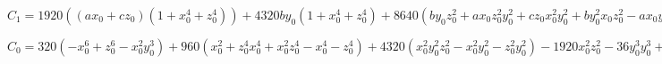 $C_1  = 1920((ax_0 + cz_0)(1 + x_0^4 + z_0^4)) + 4320by_0(1 + x_0^4 + z_0^4) + 8640(­by_0z_0^2 + 
ax_0z_0^2y_0^2 + cz_0x_0^2y_0^2 + by_0^2x_0z_0^2 -­ ax_0y_0^2 + ay_0^2 + ax_0^3y_0^2 -­ cz_0y_0^2 + cz_0^3y_0^2 - by_0x_0^2) -­ 
3840(cz_0^3 + ax_0^3 + ax_0z_0^2 - ­ax_0^2z_0^2 + cz_0x_0^2 -­ cz_0^3x_0^2) -­ 19440(by_0^3(1 -­ x_0^2 -­ z_0^2)) + 
9720.0(y_0^4(ax_0 + cz_0)) + 21870(by_0^4)­ - 640(ax_0y_0^3 - by_0^2x_0^2) -­ 108(cz_0^2y_0^2 + by_0^2y_0^3)$
 
$C_0 = 320(-­x_0^6 + z_0^6 - x_0^2y_0^3) + 960(x_0^2 + z_0^4x_0^4 + x_0^2z_0^4 -­ x_0^4 -­ z_0^4) + 4320(x_0^2y_0^2z_0^2 -­ 
x_0^2y_0^2 -­ z_0^2y_0^2) ­- 1920x_0^2z_0^2 - ­36y_0^3y_0^3 + 2160(y_0^2(1 + x_0^4 + z_0^4)) + 4860(y_0^4(x_0^2 + z_0^2  
+ 1)) + 3645y_0^5$
